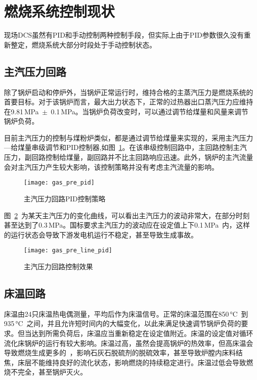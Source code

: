 \section{燃烧系统控制现状}

现场DCS虽然有PID和手动控制两种控制手段，但实际上由于PID参数很久没有重新整定，燃烧系统大部分时段处于手动控制状态。

\subsection{主汽压力回路}

除了锅炉启动和停炉外，当锅炉正常运行时，维持合格的主蒸汽压力是燃烧系统的首要目标。对于该锅炉而言，最大出力状态下，正常的过热器出口蒸汽压力应维持在9.81$\,$\si{\mega\pascal}~$\pm$~0.1$\,$\si{\mega\pascal}。当锅炉负荷改变时，可以通过调节给煤量和风量来调节锅炉负荷。
 
目前主汽压力的控制与煤粉炉类似，都是通过调节给煤量来实现的，采用主汽压力—给煤量串级调节和PID控制器,如图~\ref{fig:gas_pre_pid}。在该串级控制回路中，主回路控制主汽压力，副回路控制给煤量，副回路并不比主回路响应迅速。此外，锅炉的主汽流量会对主汽压力产生较大影响，该控制策略并没有考虑主汽流量的影响。
\begin{figure}[!htb]
\centering
\texttt{[image: gas\_pre\_pid]}
\caption{主汽压力回路PID控制策略} \label{fig:gas_pre_pid}
\end{figure}

图~\ref{fig:gas_pre_line_pid}~为某天主汽压力的变化曲线，可以看出主汽压力的波动非常大，在部分时刻甚至达到了0.3$\,$\si{\mega\pascal}。国标要求主汽压力的波动应在设定值上下0.1$\,$\si{\mega\pascal}~内，这样的运行状态会导致下游发电机运行不稳定，甚至导致生成事故。

\begin{figure}[!htb]
\centering
\texttt{[image: gas\_pre\_line\_pid]}
\caption{主汽压力回路控制效果} \label{fig:gas_pre_line_pid}
\end{figure}
 
\subsection{床温回路}
床温由24只床温热电偶测量，平均后作为床温信号。正常的床温范围在850$\,$\si{\degreeCelsius}~到935$\,$\si{\degreeCelsius}~之间，并且允许短时间内的大幅变化，以此来满足快速调节锅炉负荷的要求。但当达到所需负荷后，床温应当重新稳定在设定值附近。床温的设定值对循环流化床锅炉的运行有较大影响。床温过高，虽然会提高锅炉的热效率，但高床温会导致燃烧生成更多的~，影响石灰石脱硫剂的脱硫效率，甚至导致炉膛内床料结焦，床层不能维持良好的流化状态，影响燃烧的持续稳定进行。床温过低会导致燃烧不完全，甚至锅炉灭火。
 
